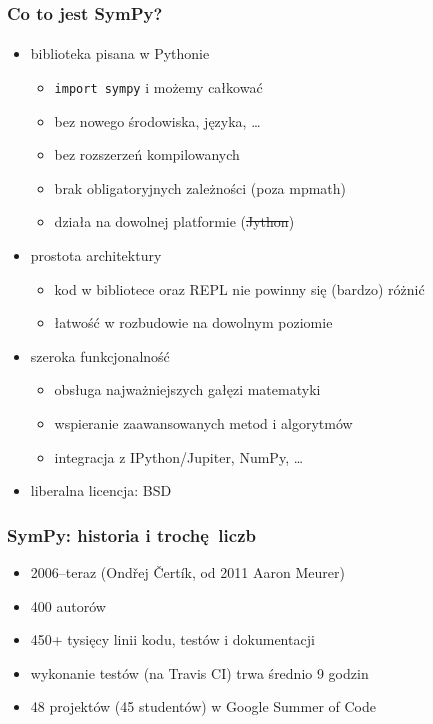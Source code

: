 \documentclass[10pt]{beamer}
\begin{document}
\begin{frame}
  \frametitle{Co to jest SymPy?}
  \framesubtitle{}

  \begin{itemize}
    \item biblioteka pisana w Pythonie
      \begin{itemize}
        \item \texttt{import sympy} i możemy całkować
        \item bez nowego środowiska, języka, \ldots
        \item bez rozszerzeń kompilowanych
        \item brak obligatoryjnych zależności (poza mpmath)
        \item działa na dowolnej platformie (\sout{Jython})
      \end{itemize}
    \item prostota architektury
      \begin{itemize}
        \item kod w bibliotece oraz REPL nie powinny się (bardzo) różnić
        \item łatwość w rozbudowie na dowolnym poziomie
      \end{itemize}
    \item szeroka funkcjonalność
      \begin{itemize}
        \item obsługa najważniejszych gałęzi matematyki
        \item wspieranie zaawansowanych metod i algorytmów
        \item integracja z IPython/Jupiter, NumPy, \ldots
      \end{itemize}
    \item liberalna licencja: BSD
  \end{itemize}
\end{frame}

\begin{frame}[fragile]
  \frametitle{SymPy: historia i trochę liczb}

  \begin{itemize}
    \item 2006--teraz (Ondřej Čertík, od 2011 Aaron Meurer)
    \item 400 autorów
    \item 450+ tysięcy linii kodu, testów i dokumentacji
    \item wykonanie testów (na Travis CI) trwa średnio 9 godzin
    \item 48 projektów (45 studentów) w Google Summer of Code
  \end{itemize}
\end{frame}
\end{document}
